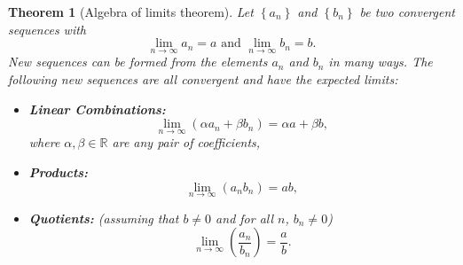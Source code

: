 \documentclass[extrafontsizes, twoside, a4paper]{memoir}
\theoremstyle{plain}%
\newtheorem{thm}{Theorem}[chapter]
\theoremstyle{definition}
\theoremstyle{remark}
\begin{document}
\begin{thm}[Algebra of limits theorem]
Let $\left \{ a_n \right \}$ and $\left \{ b_n \right \}$ be two convergent sequences with
$$\lim_{n \to \infty} a_n = a \text{ and } \lim_{n \to \infty} b_n = b .$$
New sequences can be formed from the elements $a_n$ and $b_n$ in many ways. The following new sequences are all convergent and have the expected limits:
\begin{itemize}
\item
\textbf{Linear Combinations:}
$$\lim_{n \to \infty} \left (  \alpha a_n + \beta b_n \right )= \alpha a + \beta b,$$
where $\alpha, \beta \in \mathbb{R}$ are any pair of coefficients,
\item
\textbf{Products:}
$$\lim_{n \to \infty} \left ( a_n b_n \right ) = ab,$$
\item
\textbf{Quotients:}  (assuming that $b \neq 0$ and for all $n$, $b_n \neq 0$)
$$ \lim_{n \to \infty} \left ( \frac{a_n}{b_n} \right ) = \frac{a}{b}.$$
\end{itemize}
\end{thm}
\end{document}
